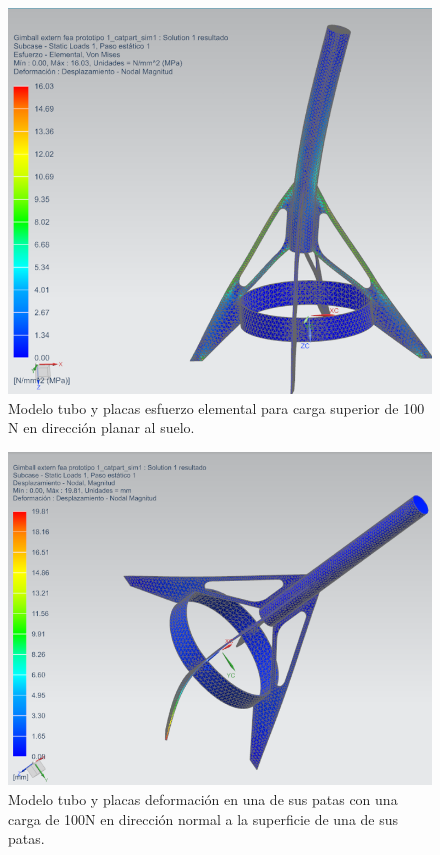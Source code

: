 \begin{figure}[htb]
    \centering
    \includegraphics[height=0.3\pdfpageheight]{fig/fea/tuboplaca3.png}
    \caption{Modelo tubo y placas esfuerzo elemental para carga superior de 100 N en dirección planar al suelo.}
    \label{fig:fea/tuboplaca3}
\end{figure}

\begin{figure}[htb]
    \centering
    \includegraphics[height=0.3\pdfpageheight]{fig/fea/tuboplaca4.png}
    \caption{Modelo tubo y placas deformación en una de sus patas con una carga de 100N en dirección normal a la superficie de una de sus patas.}
    \label{fig:fea/tuboplaca4}
\end{figure}


